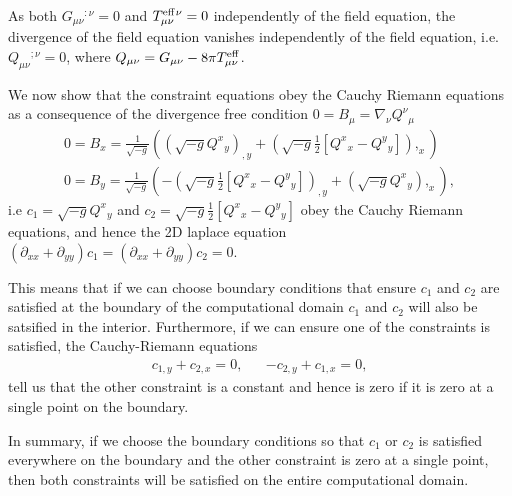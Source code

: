 \documentclass[aps,prd,amsmath,showpacs,amssymb,superscriptaddress,nofootinbib,longbibliography,eqsecnum,preprintnumbers]{revtex4-1}
\begin{document}
As both $G_{\mu \nu}{}^{:\nu}=0$ and $T_{\mu\nu}^{\rm eff}{}^{\nu}=0$ independently of the field equation, the divergence of the field equation vanishes independently of the field equation, i.e. $Q_{\mu\nu}{}^{;\nu}=0$, where  $Q_{\mu\nu} =G_{\mu\nu}-8\pi T^{\rm eff}_{\mu\nu}$.



We now show that the constraint equations obey the Cauchy Riemann equations as a consequence of the divergence free condition $0=B_{\mu}=\nabla_\nu Q^{\nu}{}_{\mu}$
\begin{align}
&0=B_x=\frac{1}{\sqrt{-g}}
\left((\sqrt{-g} Q^x{}_{y})_{,y}+(\sqrt{-g}\frac{1}{2}[Q^x{}_x-Q^y{}_y]),_x\right)
& \nonumber \\
&0=B_y=\frac{1}{\sqrt{-g}}
\left(-(\sqrt{-g} \frac{1}{2}[Q^x{}_x-Q^y{}_y])_{,y}+(\sqrt{-g}Q^x{}_y),_x\right),
& \label{eq:CR}
\end{align}
i.e $c_1=\sqrt{-g} Q^x{}_{y}$ and $c_2=\sqrt{-g}\frac{1}{2}[Q^x{}_x-Q^y{}_y]$ obey the Cauchy Riemann equations, and hence the 2D laplace equation $\left(\partial_{xx}+\partial_{yy}\right)c_1=\left(\partial_{xx}+\partial_{yy}\right)c_2=0$.

This means that if we can choose boundary conditions that ensure $c_1$ and $c_2$ are satisfied at the boundary of the computational domain $c_1$ and $c_2$ will also be satsified in the interior. Furthermore, if we can ensure one of the constraints is satisfied, the Cauchy-Riemann equations 
\begin{align}
&c_{1,y}+c_{2,x}=0,& &-c_{2,y}+c_{1,x}=0,&
\end{align}
tell us that the other constraint is a constant and hence is zero if it is zero at a single point on the boundary.

In summary, if we choose the boundary conditions so that  $c_1$ or $c_2$ is satisfied everywhere on the boundary and the other constraint is zero at a single point, then both constraints will be satisfied on the entire computational domain.
\end{document}
